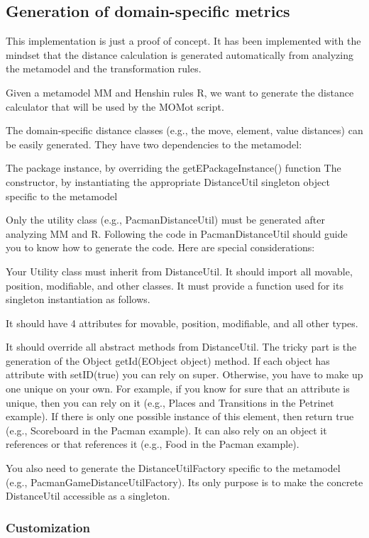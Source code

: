 \subsection{Generation of domain-specific metrics}

This implementation is just a proof of concept. It has been implemented with the mindset that the distance calculation is generated automatically from analyzing the metamodel and the transformation rules.

Given a metamodel MM and Henshin rules R, we want to generate the distance calculator that will be used by the MOMot script.

The domain-specific distance classes (e.g., the move, element, value distances) can be easily generated. They have two dependencies to the metamodel:

The package instance, by overriding the getEPackageInstance() function
The constructor, by instantiating the appropriate DistanceUtil singleton object specific to the metamodel

Only the utility class (e.g., PacmanDistanceUtil) must be generated after analyzing MM and R. Following the code in PacmanDistanceUtil should guide you to know how to generate the code. Here are special considerations:

Your Utility class must inherit from DistanceUtil.
It should import all movable, position, modifiable, and other classes.
It must provide a function used for its singleton instantiation as follows.

It should have 4 attributes for movable, position, modifiable, and all other types.

It should override all abstract methods from DistanceUtil.
The tricky part is the generation of the Object getId(EObject object) method. If each object has attribute with setID(true) you can rely on super. Otherwise, you have to make up one unique on your own. For example, if you know for sure that an attribute is unique, then you can rely on it (e.g., Places and Transitions in the Petrinet example). If there is only one possible instance of this element, then return true (e.g., Scoreboard in the Pacman example). It can also rely on an object it references or that references it (e.g., Food in the Pacman example).

You also need to generate the DistanceUtilFactory specific to the metamodel (e.g., PacmanGameDistanceUtilFactory). Its only purpose is to make the concrete DistanceUtil accessible as a singleton.

\subsubsection{Customization}

